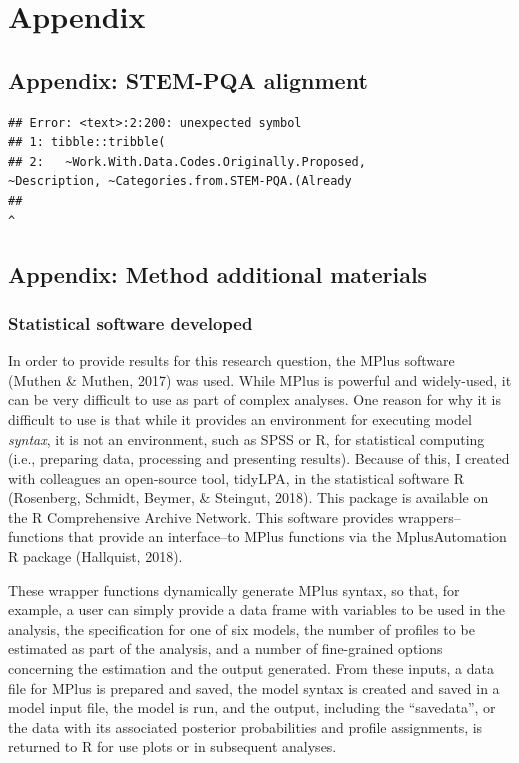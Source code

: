 \documentclass[]{msu-thesis}
\theoremstyle{definition}
\theoremstyle{definition}
\theoremstyle{definition}
\theoremstyle{remark}
\begin{document}
\chapter{Appendix}\label{appendix}

\section{Appendix: STEM-PQA
alignment}\label{appendix-stem-pqa-alignment}

\begin{verbatim}
## Error: <text>:2:200: unexpected symbol
## 1: tibble::tribble(
## 2:   ~Work.With.Data.Codes.Originally.Proposed,                                                                                                    ~Description, ~Categories.from.STEM-PQA.(Already
##                                                                                                                                                                                                           ^
\end{verbatim}

\section{Appendix: Method additional
materials}\label{appendix-method-additional-materials}

\subsection{Statistical software
developed}\label{statistical-software-developed-1}

In order to provide results for this research question, the MPlus
software (Muthen \& Muthen, 2017) was used. While MPlus is powerful and
widely-used, it can be very difficult to use as part of complex
analyses. One reason for why it is difficult to use is that while it
provides an environment for executing model \emph{syntax}, it is not an
environment, such as SPSS or R, for statistical computing (i.e.,
preparing data, processing and presenting results). Because of this, I
created with colleagues an open-source tool, tidyLPA, in the statistical
software R (Rosenberg, Schmidt, Beymer, \& Steingut, 2018). This package
is available on the R Comprehensive Archive Network. This software
provides wrappers--functions that provide an interface--to MPlus
functions via the MplusAutomation R package (Hallquist, 2018).

These wrapper functions dynamically generate MPlus syntax, so that, for
example, a user can simply provide a data frame with variables to be
used in the analysis, the specification for one of six models, the
number of profiles to be estimated as part of the analysis, and a number
of fine-grained options concerning the estimation and the output
generated. From these inputs, a data file for MPlus is prepared and
saved, the model syntax is created and saved in a model input file, the
model is run, and the output, including the ``savedata'', or the data
with its associated posterior probabilities and profile assignments, is
returned to R for use plots or in subsequent analyses.
\end{document}
